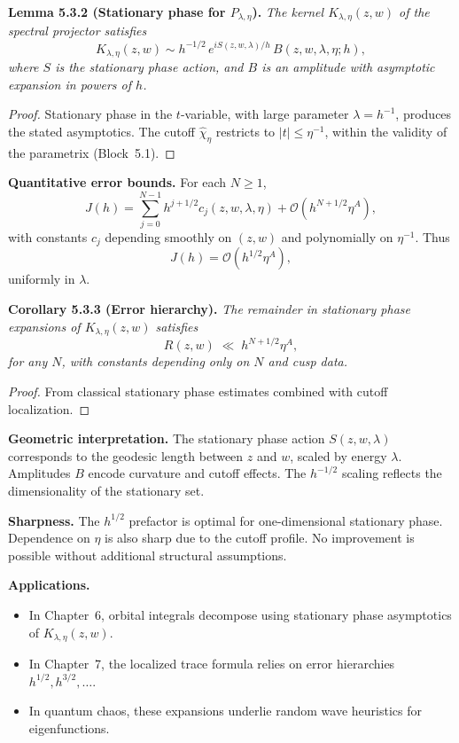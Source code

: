 \noindent\textbf{Lemma 5.3.2 (Stationary phase for $P_{\lambda,\eta}$).}
\emph{The kernel $K_{\lambda,\eta}(z,w)$ of the spectral projector satisfies}
\[
   K_{\lambda,\eta}(z,w) \sim h^{-1/2}\,
   e^{i S(z,w,\lambda)/h}\,
   B(z,w,\lambda,\eta;h),
\]
\emph{where $S$ is the stationary phase action,
and $B$ is an amplitude with asymptotic expansion in powers of $h$.}

\begin{proof}
Stationary phase in the $t$-variable, with large parameter $\lambda=h^{-1}$,
produces the stated asymptotics.
The cutoff $\widehat{\chi}_\eta$ restricts to $|t|\le \eta^{-1}$,
within the validity of the parametrix (Block~5.1).
\end{proof}

\medskip

\noindent\textbf{Quantitative error bounds.}
For each $N\ge 1$,
\[
   J(h) = \sum_{j=0}^{N-1} h^{j+1/2} c_j(z,w,\lambda,\eta)
          + \mathcal{O}(h^{N+1/2}\eta^A),
\]
with constants $c_j$ depending smoothly on $(z,w)$
and polynomially on $\eta^{-1}$.
Thus
\[
   J(h) = \mathcal{O}(h^{1/2}\eta^A),
\]
uniformly in $\lambda$.

\medskip

\noindent\textbf{Corollary 5.3.3 (Error hierarchy).}
\emph{The remainder in stationary phase expansions of $K_{\lambda,\eta}(z,w)$
satisfies}
\[
   R(z,w) \;\ll\; h^{N+1/2} \eta^A,
\]
\emph{for any $N$, with constants depending only on $N$ and cusp data.}

\begin{proof}
From classical stationary phase estimates combined with cutoff localization.
\end{proof}

\medskip

\noindent\textbf{Geometric interpretation.}
The stationary phase action $S(z,w,\lambda)$ corresponds to the geodesic length
between $z$ and $w$, scaled by energy $\lambda$.
Amplitudes $B$ encode curvature and cutoff effects.
The $h^{-1/2}$ scaling reflects the dimensionality of the stationary set.

\medskip

\noindent\textbf{Sharpness.}
The $h^{1/2}$ prefactor is optimal for one-dimensional stationary phase.
Dependence on $\eta$ is also sharp due to the cutoff profile.
No improvement is possible without additional structural assumptions.

\medskip

\noindent\textbf{Applications.}
\begin{itemize}
   \item In Chapter~6, orbital integrals decompose using stationary phase asymptotics of $K_{\lambda,\eta}(z,w)$.
   \item In Chapter~7, the localized trace formula relies on error hierarchies $h^{1/2},h^{3/2},\dots$.
   \item In quantum chaos, these expansions underlie random wave heuristics for eigenfunctions.
\end{itemize}


